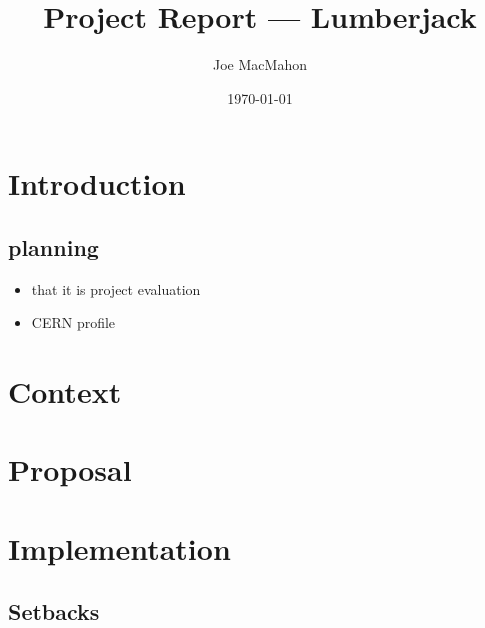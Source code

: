 \documentclass[a4paper,11pt]{article} %
\title{Project Report --- Lumberjack}
\author{Joe MacMahon}
\date{\today}
\begin{document}
\maketitle

\section{Introduction}
\label{sec:introduction}

\subsection{planning}
\begin{itemize}
\item that it is project evaluation
\item CERN profile
\end{itemize}

\section{Context}
\label{sec:context}

\section{Proposal}
\label{sec:proposal}

\section{Implementation}
\label{sec:implementation}

\subsection{Setbacks}
\label{sec:setbacks}
\end{document}
